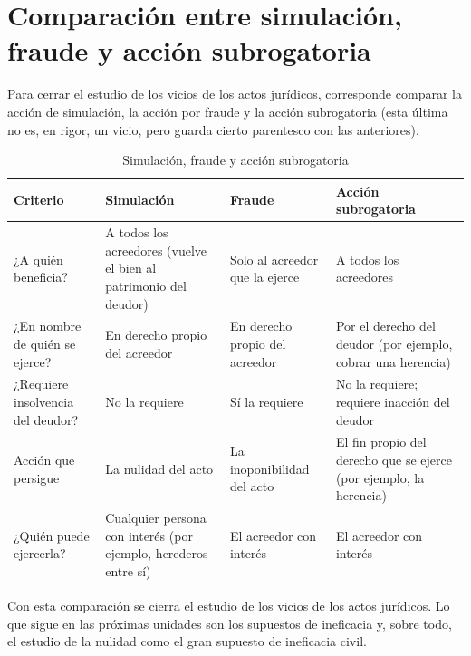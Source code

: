 \documentclass[12pt,oneside]{book}
\begin{document}

\section[Síntesis comparativa]{Comparación entre simulación, fraude y acción subrogatoria}

Para cerrar el estudio de los vicios de los actos jurídicos, corresponde comparar la acción de simulación, la acción por fraude y la acción subrogatoria (esta última no es, en rigor, un vicio, pero guarda cierto parentesco con las anteriores).

\begin{table}[H]
\centering
\caption{Simulación, fraude y acción subrogatoria}
\begin{tabularx}{\textwidth}{
    >{\raggedright\arraybackslash}p{}
    >{\raggedright\arraybackslash}X
    >{\raggedright\arraybackslash}X
    >{\raggedright\arraybackslash}X
}
\toprule
\textbf{Criterio} & \textbf{Simulación} & \textbf{Fraude} & \textbf{Acción subrogatoria} \\
\midrule
¿A quién beneficia? & A todos los acreedores (vuelve el bien al patrimonio del deudor) & Solo al acreedor que la ejerce & A todos los acreedores \\
\addlinespace
¿En nombre de quién se ejerce? & En derecho propio del acreedor & En derecho propio del acreedor & Por el derecho del deudor (por ejemplo, cobrar una herencia) \\
\addlinespace
¿Requiere insolvencia del deudor? & No la requiere & Sí la requiere & No la requiere; requiere inacción del deudor \\
\addlinespace
Acción que persigue & La nulidad del acto & La inoponibilidad del acto & El fin propio del derecho que se ejerce (por ejemplo, la herencia) \\
\addlinespace
¿Quién puede ejercerla? & Cualquier persona con interés (por ejemplo, herederos entre sí) & El acreedor con interés & El acreedor con interés \\
\bottomrule
\end{tabularx}
\end{table}

Con esta comparación se cierra el estudio de los vicios de los actos jurídicos. Lo que sigue en las próximas unidades son los supuestos de ineficacia y, sobre todo, el estudio de la nulidad como el gran supuesto de ineficacia civil.
\end{document}
